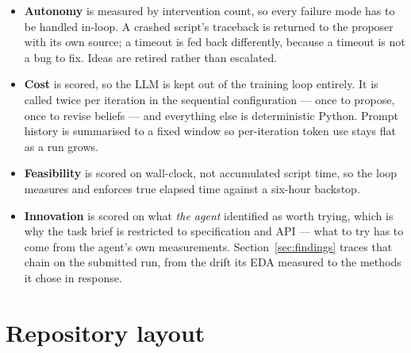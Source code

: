 \documentclass[11pt,a4paper]{article}
\begin{document}
\begin{itemize}[leftmargin=1.3em, itemsep=2pt]
  \item \textbf{Autonomy} is measured by intervention count, so every failure mode has to be
        handled in-loop. A crashed script's traceback is returned to the proposer with its own
        source; a timeout is fed back differently, because a timeout is not a bug to fix. Ideas
        are retired rather than escalated.
  \item \textbf{Cost} is scored, so the LLM is kept out of the training loop entirely. It is
        called twice per iteration in the sequential configuration --- once to propose, once to
        revise beliefs --- and everything else is deterministic Python. Prompt history is
        summarised to a fixed window so per-iteration token use stays flat as a run grows.
  \item \textbf{Feasibility} is scored on wall-clock, not accumulated script time, so the loop
        measures and enforces true elapsed time against a six-hour backstop.
  \item \textbf{Innovation} is scored on what \emph{the agent} identified as worth trying, which
        is why the task brief is restricted to specification and API --- what to try has to come
        from the agent's own measurements. Section~\ref{sec:findings} traces that chain on the
        submitted run, from the drift its EDA measured to the methods it chose in response.
\end{itemize}

\section{Repository layout}
\end{document}
